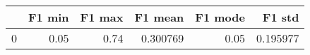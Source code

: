 \begin{tabular}{lrrrrr}
\toprule
{} &  F1 min &  F1 max &   F1 mean &  F1 mode &    F1 std \\
\midrule
0 &    0.05 &    0.74 &  0.300769 &     0.05 &  0.195977 \\
\bottomrule
\end{tabular}
